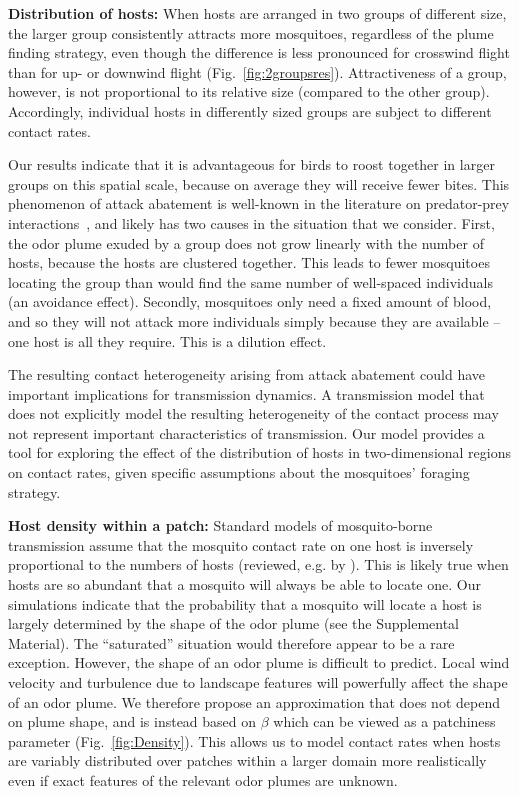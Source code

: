 \documentclass[10pt]{article}
\begin{document}
%

\textbf{Distribution of hosts:} When hosts are arranged in two groups of different
size, the larger group consistently attracts more mosquitoes,
regardless of the plume finding strategy, even though the difference
is less pronounced for crosswind flight than for up- or
downwind flight (Fig.~\ref{fig:2groupsres}).  Attractiveness
of a group, however, is not proportional to its relative size
(compared to the other group). Accordingly, individual hosts in
differently sized groups are subject to different contact rates.

Our results indicate that it is advantageous for birds to roost together in larger groups on this spatial scale, because on average they will receive fewer bites. This phenomenon of attack abatement is well-known in the literature on predator-prey interactions~\cite{Turner1986}, and likely has two causes in the situation that we consider. First, the odor plume exuded by a group does not grow linearly with the number of hosts, because the hosts are clustered together. This leads to fewer mosquitoes locating the group than would find the same number of well-spaced individuals (an avoidance effect). Secondly, mosquitoes only need a fixed amount of blood, and so they will not attack more individuals simply because they are available -- one host is all they require. This is a dilution effect.

The resulting contact heterogeneity arising from attack abatement could have important
implications for transmission dynamics. A transmission model
that does not explicitly model the resulting heterogeneity of
the contact process may not represent important characteristics
of transmission. Our model provides a tool for exploring the
effect of the distribution of hosts in two-dimensional regions on contact
rates, given specific assumptions about the mosquitoes'
foraging strategy.

%

\textbf{Host density within a patch: } Standard models of mosquito-borne transmission assume that the mosquito contact rate on one host is inversely proportional to the numbers of hosts (reviewed, e.g. by \cite{Wonham2006}). This is likely true when hosts are so abundant that a mosquito will always be able to locate one. Our simulations indicate that the probability that a mosquito will locate a host is largely determined by the shape of the odor plume (see the Supplemental Material). The ``saturated'' situation would therefore appear to be a rare exception. However, the shape of an odor plume is difficult to predict. Local wind velocity and turbulence due to landscape features will powerfully affect the shape of an odor plume. We therefore propose an approximation that does not depend on plume shape, and is instead based on $\beta$ which can be viewed as a patchiness parameter (Fig.~\ref{fig:Density}).
This allows us to model contact rates when hosts are variably distributed over patches within a larger domain more realistically even if exact features of the relevant odor plumes are unknown.
\end{document}
